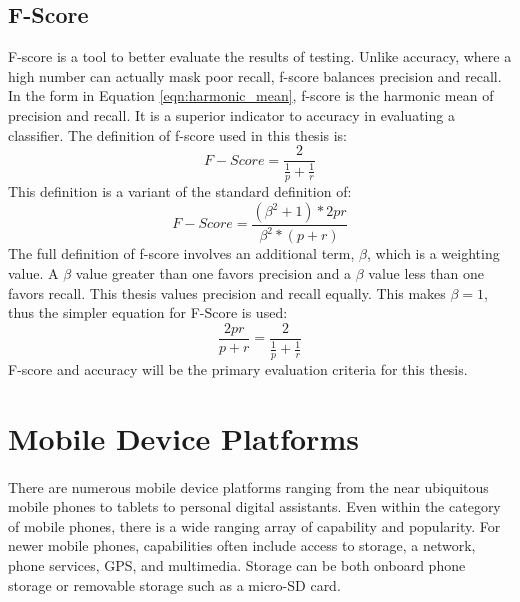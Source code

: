 	\subsection {F-Score} F-score is a tool to better evaluate the results of testing.  Unlike accuracy, where a high number can actually mask poor recall, f-score balances precision and recall. In the form in Equation \ref{eqn:harmonic_mean}, f-score is the harmonic mean of precision and recall.  It is a superior indicator to accuracy in evaluating a classifier. The definition of f-score used in this thesis is:
	\begin{equation} \label{eqn:harmonic_mean} F-Score = \frac{2}{ \frac{1}{p} + \frac{1}{r} } \end{equation}
	This definition is a variant of the standard definition of:
	\begin{equation} F-Score = \frac{(\beta^2 + 1) * 2pr}{\beta^2 * (p + r)} \end{equation}
	The full definition of f-score involves an additional term, $\beta$, which is a weighting value.  A $\beta$ value greater than one favors precision and a $\beta$ value less than one favors recall.  This thesis values precision and recall equally.  This makes $\beta = 1$, thus the simpler equation for F-Score is used:
	\begin{equation} \frac{2pr}{p + r} = \frac{2}{ \frac{1}{p} + \frac{1}{r} }\end{equation}  F-score and accuracy will be the primary evaluation criteria for this thesis.\cite{sokolova_beyond_2006}

\section{Mobile Device Platforms}  
	\paragraph{}There are numerous mobile device platforms ranging from the near ubiquitous mobile phones to tablets to personal digital assistants.  Even within the category of mobile phones, there is a wide ranging array of capability and popularity.  For newer mobile phones, capabilities often include access to storage, a network, phone services, GPS, and multimedia.  Storage can be both onboard phone storage or removable storage such as a micro-SD card.  
